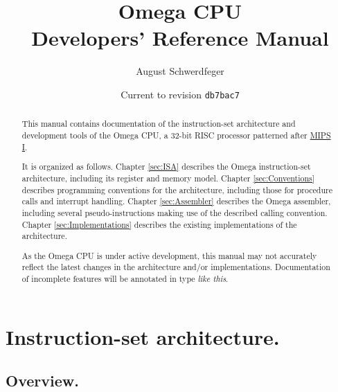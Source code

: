 \documentclass[12pt,english,twoside]{report}
\def\code{\texttt}
\newcommand\incomplete[1]{{\color{red}\it #1}}
\begin{document}
\title{\textbf{Omega CPU\\
Developers' Reference Manual}}


\author{August Schwerdfeger}


\date{Current to revision \code{db7bac7}}

\maketitle
\tableofcontents{}

\begin{abstract}
This manual contains documentation of the instruction-set architecture
and development tools of the Omega CPU, a 32-bit RISC processor
patterned after \href{https://en.wikipedia.org/wiki/MIPS_architecture#MIPS_I}{MIPS I}.

It is organized as follows. Chapter \ref{sec:ISA} describes the Omega
instruction-set architecture, including its register and memory model.
Chapter \ref{sec:Conventions} describes programming conventions for
the architecture, including those for procedure calls and interrupt
handling. Chapter \ref{sec:Assembler} describes the Omega assembler,
including several pseudo-instructions making use of the described
calling convention. Chapter \ref{sec:Implementations} describes the
existing implementations of the architecture.

As the Omega CPU is under active development, this manual may not
accurately reflect the latest changes in the architecture and/or
implementations. Documentation of incomplete features will be
annotated in type \incomplete{like this}.
\end{abstract}

\chapter{\label{sec:ISA} Instruction-set architecture.}

\section{Overview.}
\end{document}
